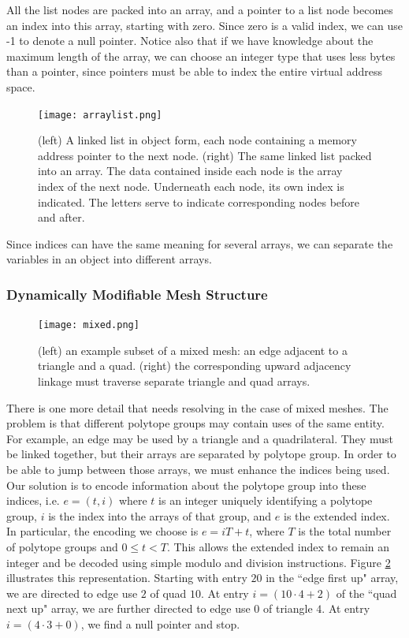 All the list nodes are packed into an array, and a pointer to
a list node becomes an index into this array, starting with zero.
Since zero is a valid index, we can use -1 to denote a null pointer.
Notice also that if we have knowledge about the maximum length
of the array, we can choose an integer type that uses less bytes
than a pointer, since pointers must be able to index the entire
virtual address space.

\begin{figure}
\begin{center}
\texttt{[image: arraylist.png]}
\caption{(left) A linked list in object form, each node containing
a memory address pointer to the next node.
(right) The same linked list packed into an array.
The data contained inside each node is the array index of the next node.
Underneath each node, its own index is indicated.
The letters serve to indicate corresponding nodes before and after.}
\label{fig:arraylist}
\end{center}
\end{figure}

Since indices can have the same meaning for several arrays,
we can separate the variables in an object into different
arrays.

\subsubsection{Dynamically Modifiable Mesh Structure}
\label{sec:sisc_mstruct}

\begin{figure}
\begin{center}
\texttt{[image: mixed.png]}
\caption{(left) an example subset of a mixed mesh:
an edge adjacent to a triangle and a quad.
(right) the corresponding upward adjacency linkage
must traverse separate triangle and quad arrays.}
\label{fig:mixed}
\end{center}
\end{figure}

There is one more detail that needs resolving in the
case of mixed meshes.
The problem is that different polytope
groups may contain uses of the same entity.
For example, an edge may be used by a triangle and a quadrilateral.
They must be linked together, but their arrays are
separated by polytope group.
In order to be able to jump between those arrays, we must
enhance the indices being used.
Our solution is to encode information about the polytope group
into these indices, i.e. $e = (t,i)$ where $t$ is an integer
uniquely identifying a polytope group, $i$ is the index
into the arrays of that group, and $e$ is the extended index.
In particular, the encoding we choose is $e = iT + t$, where
$T$ is the total number of polytope groups and $0\leq t < T$.
This allows the extended index to remain an integer
and be decoded using simple modulo and division instructions.
Figure \ref{fig:mixed} illustrates this representation.
Starting with entry $20$ in the ``edge first up" array,
we are directed to edge use $2$ of quad $10$.
At entry $i=(10\cdot 4 + 2)$ of the ``quad next up" array,
we are further directed to edge use $0$ of triangle $4$.
At entry $i=(4\cdot 3 + 0)$, we find a null pointer and stop.

